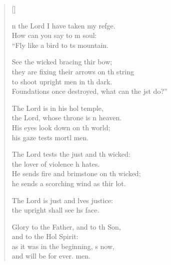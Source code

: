 \settowidth{\versewidth}{Foundations once destroyed, what can the just do?”}
\begin{verse}[\versewidth]
  \begin{patverse}
n the Lord I have taken my refge.\Flex\\
How can you say to m soul:\Med\\
“Fly like a bird to \pointup{\i}ts mountain.

See the wicked bracing thir bow;\Med\\
they are fixing their arrows on th string\\
to shoot upright men in th dark.\Med\\
Foundations once destroyed, what can the jst do?”

The Lord is in his hol temple,\Med\\
the Lord, whose throne is \pointup{\i}n heaven.\\
His eyes look down on th world;\Med\\
his gaze tests mortl men.

The Lord tests the just and th wicked:\Med\\
the lover of violence h hates.\\
He sends fire and brimstone on th wicked;\Med\\
he sends a scorching wind as thir lot.

The Lord is just and lves justice:\Med\\
the upright shall see h\pointup{\i}s face.

Glory to the Father, and to th Son,\Med\\
and to the Hol Spirit:\\
as it was in the beginning, \pointup{\i}s now,\Med\\
and will be for ever. men.
  \end{patverse}
\end{verse}
